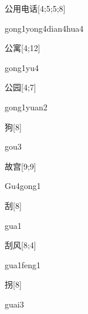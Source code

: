 \begin{verbete}{公用电话}[4;5;5;8]
\begin{pronuncia}{gong1yong4dian4hua4}
\end{pronuncia}
\end{verbete}

\begin{verbete}[gong1yu4]{公寓}[4;12]
\begin{pronuncia}{gong1yu4}
\end{pronuncia}
\end{verbete}

\begin{verbete}{公园}[4;7]
\begin{pronuncia}{gong1yuan2}
\end{pronuncia}
\end{verbete}

\begin{verbete}[gou3]{狗}[8]
\begin{pronuncia}{gou3}
\end{pronuncia}
\end{verbete}

\begin{verbete}[Gu4gong1]{故宫}[9;9]
\begin{pronuncia}{Gu4gong1}
\end{pronuncia}
\end{verbete}

\begin{verbete}[gua1]{刮}[8]
\begin{pronuncia}{gua1}
\end{pronuncia}
\end{verbete}

\begin{verbete}{刮风}[8;4]
\begin{pronuncia}{gua1feng1}
\end{pronuncia}
\end{verbete}

\begin{verbete}[guai3]{拐}[8]
\begin{pronuncia}{guai3}
\end{pronuncia}
\end{verbete}

